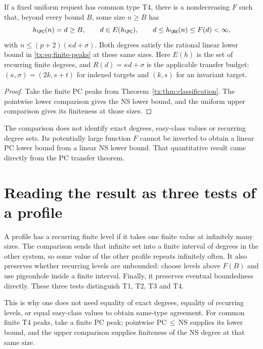 \begin{corollary}\label{tx:cor:common-peaks}
If a fixed uniform request has common type T4, there is a nondecreasing
$F$ such that, beyond every bound $B$, some size $n\ge B$ has
\[
 h_{\PC}(n)=d\ge B,\qquad d\in E(h_{\PC}),\qquad
 d\le h_{\NS}(n)\le F(d)<\infty,
\]
with $n\le(p+2)(\kappa d+\sigma)$. Both degrees satisfy the rational
linear lower bound in \eqref{tx:eq:finite-peaks} at these same sizes.
Here $E(h)$ is the set of recurring finite degrees, and
$R(d)=\kappa d+\sigma$ is the applicable transfer budget: $(\kappa,\sigma)
=(2k,s+t)$ for indexed targets and $(k,s)$ for an invariant target.
\end{corollary}
\begin{proof}
Take the finite PC peaks from Theorem~\ref{tx:thm:classification}.
The pointwise lower comparison gives the NS lower bound, and the uniform
upper comparison gives its finiteness at those sizes.
\end{proof}

The comparison does not identify exact degrees, easy-class values or
recurring degree sets. Its potentially large function $F$ cannot be
inverted to obtain a linear PC lower bound from a linear NS lower bound.
That quantitative result came directly from the PC transfer theorem.

\section{Reading the result as three tests of a profile}
A profile has a recurring finite level if it takes one finite value at
infinitely many sizes. The comparison sends that infinite set into a
finite interval of degrees in the other system, so some value of the
other profile repeats infinitely often. It also preserves whether
recurring levels are unbounded: choose levels above $F(B)$ and use
pigeonhole inside a finite interval. Finally, it preserves eventual
boundedness directly. These three tests distinguish T1, T2, T3 and T4.

This is why one does not need equality of exact degrees, equality of
recurring levels, or equal easy-class values to obtain same-type
agreement. For common finite T4 peaks, take a finite PC peak; pointwise
PC\,$\le$\,NS supplies its lower bound, and the upper comparison supplies
finiteness of the NS degree at that same size.
